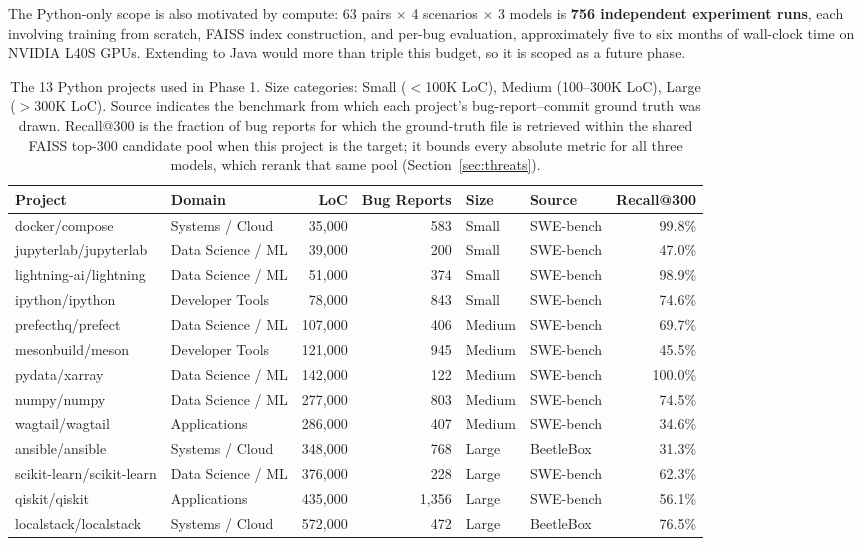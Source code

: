 \documentclass[a4paper,fleqn]{cas-dc}
\begin{document}
The Python-only scope is also motivated by compute: 63 pairs $\times$ 4
scenarios $\times$ 3 models is \textbf{756 independent experiment runs},
each involving training from scratch, FAISS index construction, and
per-bug evaluation, approximately five to six months of wall-clock time
on NVIDIA L40S GPUs. Extending to Java would more than triple this budget,
so it is scoped as a future phase.

\begin{table}[t]
\centering
\caption{The 13 Python projects used in Phase 1. Size categories: Small ($<$100K LoC),
Medium (100--300K LoC), Large ($>$300K LoC). Source indicates the benchmark from which
each project's bug-report--commit ground truth was drawn. Recall@300 is the fraction
of bug reports for which the ground-truth file is retrieved within the shared
FAISS top-300 candidate pool when this project is the target; it bounds every
absolute metric for all three models, which rerank that same pool
(Section~\ref{sec:threats}).}
\label{tab:dataset}
\small
\begin{tabular}{@{}llrrllr@{}}
\toprule
\textbf{Project} & \textbf{Domain} & \textbf{LoC} & \textbf{Bug Reports} & \textbf{Size} & \textbf{Source} & \textbf{Recall@300} \\
\midrule
docker/compose          & Systems / Cloud     &  35,000 &  583 & Small  & SWE-bench & 99.8\% \\
jupyterlab/jupyterlab   & Data Science / ML   &  39,000 &  200 & Small  & SWE-bench & 47.0\% \\
lightning-ai/lightning  & Data Science / ML   &  51,000 &  374 & Small  & SWE-bench & 98.9\% \\
ipython/ipython         & Developer Tools     &  78,000 &  843 & Small  & SWE-bench & 74.6\% \\
prefecthq/prefect       & Data Science / ML   & 107,000 &  406 & Medium & SWE-bench & 69.7\% \\
mesonbuild/meson        & Developer Tools     & 121,000 &  945 & Medium & SWE-bench & 45.5\% \\
pydata/xarray           & Data Science / ML   & 142,000 &  122 & Medium & SWE-bench & 100.0\% \\
numpy/numpy             & Data Science / ML   & 277,000 &  803 & Medium & SWE-bench & 74.5\% \\
wagtail/wagtail         & Applications        & 286,000 &  407 & Medium & SWE-bench & 34.6\% \\
ansible/ansible         & Systems / Cloud     & 348,000 &  768 & Large  & BeetleBox & 31.3\% \\
scikit-learn/scikit-learn & Data Science / ML & 376,000 &  228 & Large  & SWE-bench & 62.3\% \\
qiskit/qiskit           & Applications        & 435,000 & 1,356 & Large  & SWE-bench & 56.1\% \\
localstack/localstack   & Systems / Cloud     & 572,000 &  472 & Large  & BeetleBox & 76.5\% \\
\bottomrule
\end{tabular}
\end{table}
\end{document}
